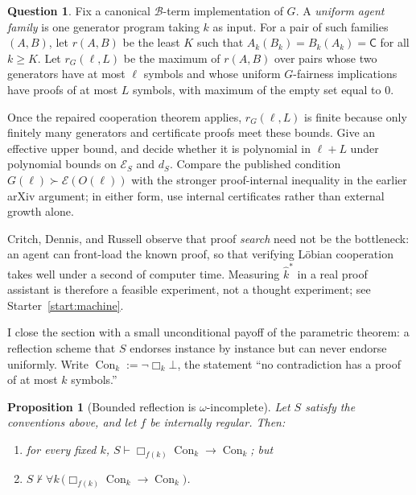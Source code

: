 \documentclass[11pt]{amsart}
\theoremstyle{plain}
\newtheorem{proposition}[theorem]{Proposition}
\theoremstyle{definition}
\newtheorem{question}[theorem]{Question}
\newcommand{\Con}{\operatorname{Con}}
\newcommand{\Bud}{\mathcal{B}}
\begin{document}
\begin{question}
\label{q:polyfairbot}
Fix a canonical $\Bud$-term implementation of $G$. A \emph{uniform agent family} is one generator program taking $k$ as input. For a pair of such families $(A,B)$, let $r(A,B)$ be the least $K$ such that $A_k(B_k)=B_k(A_k)=\mathsf C$ for all $k\ge K$. Let $r_G(\ell,L)$ be the maximum of $r(A,B)$ over pairs whose two generators have at most $\ell$ symbols and whose uniform $G$-fairness implications have proofs of at most $L$ symbols, with maximum of the empty set equal to $0$.

Once the repaired cooperation theorem applies, $r_G(\ell,L)$ is finite because only finitely many generators and certificate proofs meet these bounds. Give an effective upper bound, and decide whether it is polynomial in $\ell+L$ under polynomial bounds on $\mathcal E_S$ and $d_S$. Compare the published condition $G(\ell)\succ\mathcal E(O(\ell))$ with the stronger proof-internal inequality in the earlier arXiv argument; in either form, use internal certificates rather than external growth alone.
\end{question}

Critch, Dennis, and Russell \cite{cdr2022} observe that proof \emph{search} need not be the bottleneck: an agent can front-load the known proof, so that verifying L\"obian cooperation takes well under a second of computer time. Measuring $\hat{k}^{*}$ in a real proof assistant is therefore a feasible experiment, not a thought experiment; see Starter~\ref{start:machine}.

I close the section with a small unconditional payoff of the parametric theorem: a reflection scheme that $S$ endorses instance by instance but can never endorse uniformly. Write $\Con_k := \neg\Box_k \bot$, the statement ``no contradiction has a proof of at most $k$ symbols.''

\begin{proposition}[Bounded reflection is $\omega$-incomplete]
\label{prop:omega}
Let $S$ satisfy the conventions above, and let $f$ be internally regular. Then:
\begin{enumerate}
\item for every fixed $k$, \; $S \vdash \Box_{f(k)}\Con_k \to \Con_k$; \quad but
\item $S \nvdash \forall k\,\bigl(\Box_{f(k)}\Con_k \to \Con_k\bigr)$.
\end{enumerate}
\end{proposition}
\end{document}
